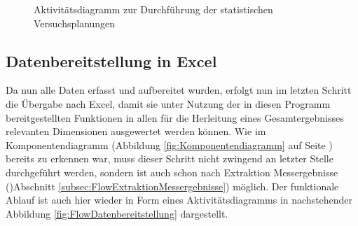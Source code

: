 \documentclass[
fontsize=10pt, 
listof = totoc,
parskip = half	
]{report}
\begin{document}
\begin{figure}[H]
	\centering
	\caption{Aktivitätsdiagramm zur Durchführung der statistischen Versuchsplanungen}
	\label{fig:FlowVersuchsplanung}
\end{figure}

\subsection{Datenbereitstellung in Excel}
\label{subsec:FlowDataToExcel}

Da nun alle Daten erfasst und aufbereitet wurden, erfolgt nun im letzten Schritt die Übergabe nach Excel, damit sie unter Nutzung der in diesen Programm bereitgestellten Funktionen in allen für die Herleitung eines Gesamtergebnisses relevanten Dimensionen ausgewertet werden können. Wie im Komponentendiagramm (Abbildung \ref{fig:Komponentendiagramm} auf Seite \pageref{fig:Komponentendiagramm}) bereits zu erkennen war, muss dieser Schritt nicht zwingend an letzter Stelle durchgeführt werden, sondern ist auch schon nach Extraktion Messergebnisse ()Abschnitt \ref{subsec:FlowExtraktionMessergebnisse}) möglich. Der funktionale Ablauf ist auch hier wieder in Form eines Aktivitätsdiagramms in nachstehender Abbildung \ref{fig:FlowDatenbereitstellung} dargestellt.
\end{document}
